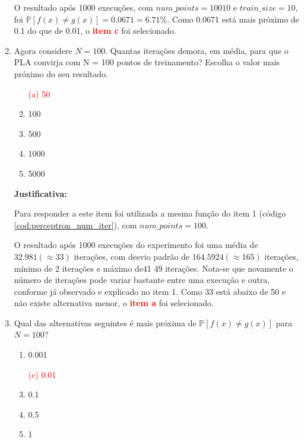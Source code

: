 \begin{enumerate}
    O resultado após 1000 execuções, com $num\_points = 10010$ e $train\_size = 10$, foi  $\mathbb{P}[f(x) \neq g(x)] = 0.0671 = 6.71\%$. Como 0.0671 está mais próximo de 0.1 do que de 0.01, o \textcolor{red}{\textbf{item c}} foi selecionado. 

    \item Agora considere $N = 100$. Quantas iterações demora, em média, para que o PLA convirja com
    N = 100 pontos de treinamento? Escolha o valor mais próximo do seu resultado.

    \begin{enumerate}
        \item[\textcolor{red}{(a)}]\textcolor{red}{50}\addtocounter{enumii}{1}
        \item 100
        \item 500
        \item 1000
        \item 5000
    \end{enumerate}
     
    \par

    \textbf{Justificativa:}

    Para responder a este item foi utilizada a mesma função do item 1 (código \ref{cod:perceptron_num_iter}), com $num\_points = 100$. 
    
    O resultado após 1000 execuções do experimento foi uma média de $32.981 (\approx 33)$ iterações, com desvio padrão de $164.5924 (\approx 165)$ iterações, mínimo de 2 iterações e máximo de41 49 iterações. Nota-se que novamente o número de iterações pode variar bastante entre uma execução e outra, conforme já observado e explicado no item 1. Como 33 está abaixo de 50 e não existe alternativa menor, o \textcolor{red}{\textbf{item a}} foi selecionado. 
     

    \item Qual das alternativas seguintes é mais próxima de $\mathbb{P}[f(x) \neq g(x)]$ para $N = 100$?
    
    \begin{enumerate}
        \item 0.001
        \item[\textcolor{red}{(c)}]\textcolor{red}{0.01}\addtocounter{enumii}{1}
        \item 0.1
        \item 0.5
        \item 1
    \end{enumerate}


\end{enumerate}
